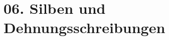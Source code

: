 \documentclass[handout,aspectratio=1610,dvipsnames]{beamer}
\begin{document}
  \section{06. Silben und Dehnungsschreibungen}
  \let\woopsi\section\let\section\subsection\let\subsection\subsubsection
  
  \let\subsection\section\let\section\woopsi
  
\end{document}
